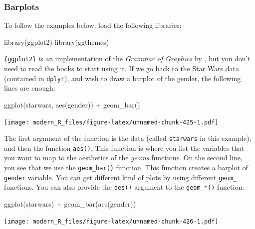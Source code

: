 \documentclass[
]{article}
\newenvironment{Shaded}{\begin{snugshade}}{\end{snugshade}}
\newcommand{\FunctionTok}[1]{\textcolor[rgb]{0.00,0.00,0.00}{#1}}
\newcommand{\NormalTok}[1]{#1}
\newcommand{\SpecialCharTok}[1]{\textcolor[rgb]{0.00,0.00,0.00}{#1}}
\begin{document}
\hypertarget{barplots}{%
\subsubsection{Barplots}\label{barplots}}

To follow the examples below, load the following libraries:

\begin{Shaded}
\begin{Highlighting}[]
\FunctionTok{library}\NormalTok{(ggplot2)}
\FunctionTok{library}\NormalTok{(ggthemes)}
\end{Highlighting}
\end{Shaded}

\texttt{\{ggplot2\}} is an implementation of the \emph{Grammar of Graphics} by \citet{wilkinson2006}, but you don't need
to read the books to start using it. If we go back to the Star Wars data (contained in \texttt{dplyr}),
and wish to draw a barplot of the gender, the following lines are enough:

\begin{Shaded}
\begin{Highlighting}[]
\FunctionTok{ggplot}\NormalTok{(starwars, }\FunctionTok{aes}\NormalTok{(gender)) }\SpecialCharTok{+}
  \FunctionTok{geom\_bar}\NormalTok{()}
\end{Highlighting}
\end{Shaded}

\texttt{[image: modern\_R\_files/figure-latex/unnamed-chunk-425-1.pdf]}

The first argument of the function is the data (called \texttt{starwars} in this example), and then the
function \texttt{aes()}. This function is where you list the variables that you want to map to the aesthetics
of the \emph{geoms} functions. On the second line, you see that we use the \texttt{geom\_bar()} function. This
function creates a barplot of \texttt{gender} variable.
You can get different kind of plots by using different \texttt{geom\_} functions. You can also provide the
\texttt{aes()} argument to the \texttt{geom\_*()} function:

\begin{Shaded}
\begin{Highlighting}[]
\FunctionTok{ggplot}\NormalTok{(starwars) }\SpecialCharTok{+}
  \FunctionTok{geom\_bar}\NormalTok{(}\FunctionTok{aes}\NormalTok{(gender))}
\end{Highlighting}
\end{Shaded}

\texttt{[image: modern\_R\_files/figure-latex/unnamed-chunk-426-1.pdf]}
\end{document}
